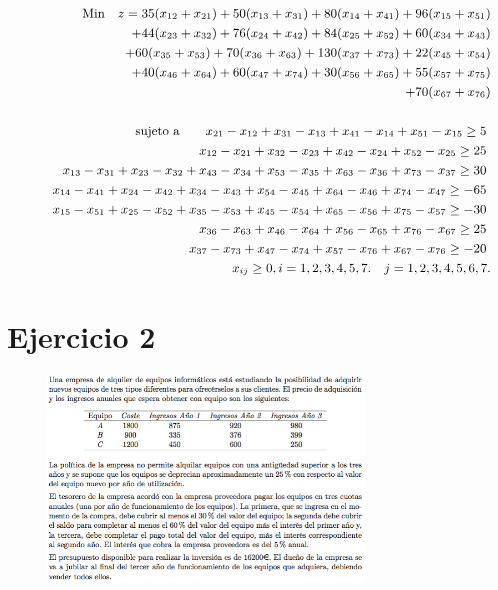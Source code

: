\documentclass[10pt, a4paper]{article}
\begin{document}
			\[
			    \small
			    \begin{split}
				    \text{Min} \quad z = 35(x_{12}+x_{21}) + 50(x_{13}+x_{31}) + 80(x_{14}+x_{41}) + 96(x_{15}+x_{51}) \\
			        + 44(x_{23}+x_{32}) + 76(x_{24}+x_{42})+ 84(x_{25}+x_{52}) + 60(x_{34}+x_{43}) \\
			        + 60(x_{35}+x_{53}) + 70(x_{36}+x_{63}) + 130(x_{37}+x_{73}) + 22(x_{45}+x_{54})  \\
			        + 40(x_{46}+x_{64}) + 60(x_{47}+x_{74}) + 30(x_{56}+x_{65}) + 55(x_{57}+x_{75}) \\
			        + 70(x_{67}+x_{76})  \\
			                            \\
			        \text{sujeto a}
			        \qquad 	x_{21} - x_{12} + x_{31} - x_{13} + x_{41} - x_{14} + x_{51} - x_{15}  \geq 5  \\
			        \qquad 	x_{12} - x_{21} + x_{32} - x_{23} + x_{42} - x_{24} + x_{52} - x_{25}  \geq 25  \\
			        \qquad 	x_{13} - x_{31} + x_{23} - x_{32} + x_{43} - x_{34} + x_{53} - x_{35} + x_{63} - x_{36} + x_{73} - x_{37} \geq 30  \\
			        \qquad 	x_{14} - x_{41} + x_{24} - x_{42} + x_{34} - x_{43} + x_{54} - x_{45} + x_{64} - x_{46} + x_{74} - x_{47} \geq -65  \\
			        \qquad 	x_{15} - x_{51} + x_{25} - x_{52} + x_{35} - x_{53} + x_{45} - x_{54} + x_{65} - x_{56} + x_{75} - x_{57}  \geq -30  \\
			        \qquad 	x_{36} - x_{63} + x_{46} - x_{64} + x_{56} - x_{65} + x_{76} - x_{67}  \geq 25  \\
			        \qquad 	x_{37} - x_{73} + x_{47} - x_{74} + x_{57} - x_{76} + x_{67} - x_{76}  \geq -20  \\
			        \qquad  x_{ij} \geq 0, i=1,2,3,4,5,7. \quad j=1,2,3,4,5,6,7.
			    \end{split}
			    \]

    \section{Ejercicio 2}

        \begin{figure}[H]
        \centering
            \includegraphics[width=0.75\textwidth]{res/Exercise_2.png}
        \end{figure}
\end{document}
